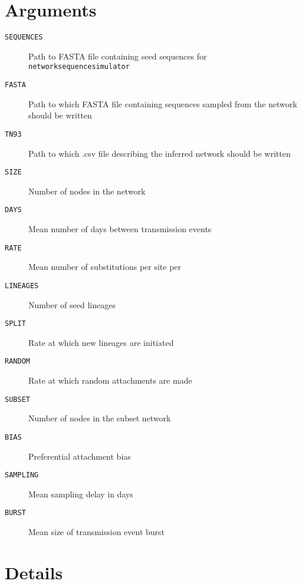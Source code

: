 \documentclass[12pt]{scrartcl}
\begin{document}
\section{Arguments}
\begin{description}
\item[\texttt{SEQUENCES}] Path to FASTA file containing seed sequences for \texttt{network{\textunderscore}sequence{\textunderscore}simulator}
\item[\texttt{FASTA}] Path to which FASTA file containing sequences sampled from the network should be written
\item[\texttt{TN93}] Path to which .csv file describing the inferred network should be written
\item[\texttt{SIZE}] Number of nodes in the network
\item[\texttt{DAYS}] Mean number of days between transmission events
\item[\texttt{RATE}] Mean number of substitutions per site per
\item[\texttt{LINEAGES}] Number of seed lineages
\item[\texttt{SPLIT}] Rate at which new lineages are initiated
\item[\texttt{RANDOM}] Rate at which random attachments are made
\item[\texttt{SUBSET}] Number of nodes in the subset network
\item[\texttt{BIAS}] Preferential attachment bias
\item[\texttt{SAMPLING}] Mean sampling delay in days
\item[\texttt{BURST}] Mean size of transmission event burst
\end{description}

\section{Details}
\end{document}
